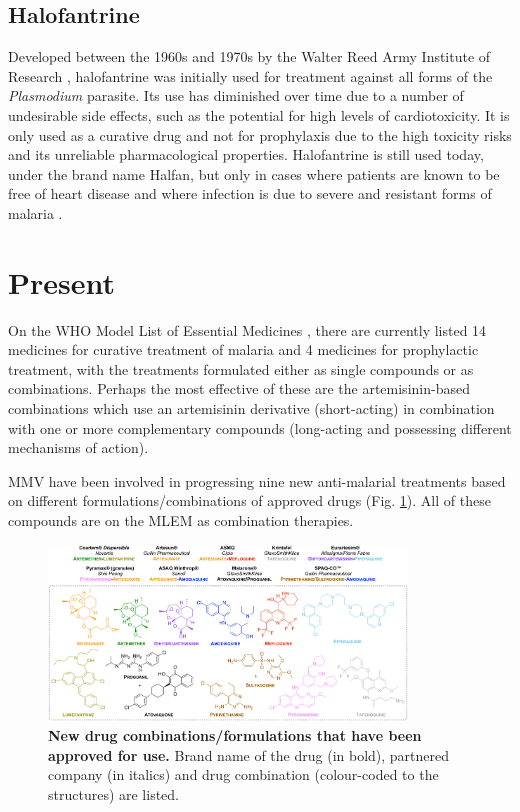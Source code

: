 \documentclass[twocolumn]{bmcart}%
\begin{document}
\subsection*{Halofantrine}
Developed between the 1960s and 1970s by the Walter Reed Army Institute of Research \cite{Cosgriff1982}, halofantrine was initially used for treatment against all forms of the \textit{Plasmodium} parasite. Its use has diminished over time due to a number of undesirable side effects, such as the potential for high levels of cardiotoxicity. It is only used as a curative drug and not for prophylaxis due to the high toxicity risks and its unreliable pharmacological properties. Halofantrine is still used today, under the brand name Halfan\texttrademark, but only in cases where patients are known to be free of heart disease and where infection is due to severe and resistant forms of malaria \cite{Croft2007}.

\section*{Present}
On the WHO Model List of Essential Medicines \cite{MLEM}, there are currently listed 14 medicines for curative treatment of malaria and 4 medicines for prophylactic treatment, with the treatments formulated either as single compounds or as combinations. Perhaps the most effective of these are the artemisinin-based combinations which use an artemisinin derivative (short-acting) in combination with one or more complementary compounds (long-acting and possessing different mechanisms of action).

MMV have been involved in progressing nine new anti-malarial treatments based on different formulations/combinations of approved drugs (Fig. \ref{Figure2}). All of these compounds are on the MLEM as combination therapies.

\begin{figure}
	\includegraphics [width=0.85\textwidth] {Figure2}
	\caption{{\bf New drug combinations/formulations that have been approved for use.} Brand name of the drug (in bold), partnered company (in italics) and drug combination (colour-coded to the structures) are listed.}
	\label{Figure2}
\end{figure}
\end{document}
